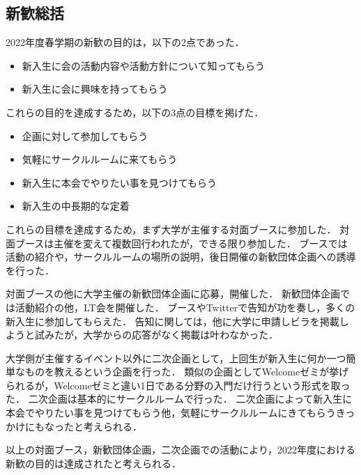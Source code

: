 \subsection*{新歓総括}


2022年度春学期の新歓の目的は，以下の2点であった．

\begin{itemize}
    \item 新入生に会の活動内容や活動方針について知ってもらう
    \item 新入生に会に興味を持ってもらう
\end{itemize}

これらの目的を達成するため，以下の3点の目標を掲げた．

\begin{itemize}
    \item 企画に対して参加してもらう
    \item 気軽にサークルルームに来てもらう
    \item 新入生に本会でやりたい事を見つけてもらう
    \item 新入生の中長期的な定着
\end{itemize}

これらの目標を達成するため，まず大学が主催する対面ブースに参加した．
対面ブースは主催を変えて複数回行われたが，できる限り参加した．
ブースでは活動の紹介や，サークルルームの場所の説明，後日開催の新歓団体企画への誘導を行った．

対面ブースの他に大学主催の新歓団体企画に応募，開催した．
新歓団体企画では活動紹介の他，LT会を開催した．
ブースやTwitterで告知が功を奏し，多くの新入生に参加してもらえた．
告知に関しては，他に大学に申請しビラを掲載しようと試みたが，大学からの応答がなく掲載は叶わなかった．

大学側が主催するイベント以外に二次企画として，上回生が新入生に何か一つ簡単なものを教えるという企画を行った．
類似の企画としてWelcomeゼミが挙げられるが，Welcomeゼミと違い1日である分野の入門だけ行うという形式を取った．
二次企画は基本的にサークルルームで行った．
二次企画によって新入生に本会でやりたい事を見つけてもらう他，気軽にサークルルームにきてもらうきっかけにもなったと考えられる．

以上の対面ブース，新歓団体企画，二次企画での活動により，2022年度における新歓の目的は達成されたと考えられる．
